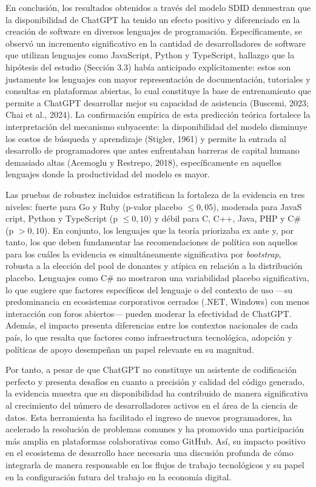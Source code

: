 \documentclass[12pt,a4paper]{article}
\begin{document}
En conclusión, los resultados obtenidos a través del modelo SDID demuestran que la disponibilidad de ChatGPT ha tenido un efecto positivo y diferenciado en la creación de software en diversos lenguajes de programación. Específicamente, se observó un incremento significativo en la cantidad de desarrolladores de software que utilizan lenguajes como JavaScript, Python y TypeScript, hallazgo que la hipótesis del estudio (Sección 3.3) había anticipado explícitamente: estos son justamente los lenguajes con mayor representación de documentación, tutoriales y consultas en plataformas abiertas, lo cual constituye la base de entrenamiento que permite a ChatGPT desarrollar mejor su capacidad de asistencia (Buscemi, 2023; Chai et al., 2024). La confirmación empírica de esta predicción teórica fortalece la interpretación del mecanismo subyacente: la disponibilidad del modelo disminuye los costos de búsqueda y aprendizaje (Stigler, 1961) y permite la entrada al desarrollo de programadores que antes enfrentaban barreras de capital humano demasiado altas (Acemoglu y Restrepo, 2018), específicamente en aquellos lenguajes donde la productividad del modelo es mayor.

Las pruebas de robustez incluidos estratifican la fortaleza de la evidencia en tres niveles: fuerte para Go y Ruby (p-valor placebo $\leq 0{,}05$), moderada para JavaS cript, Python y TypeScript (p $\leq 0{,}10$) y débil para C, C++, Java, PHP y C\# (p $> 0{,}10$). En conjunto, los lenguajes que la teoría priorizaba ex ante y, por tanto, los que deben fundamentar las recomendaciones de política son aquellos para los cuáles la evidencia es simultáneamente significativa por \textit{bootstrap}, robusta a la elección del pool de donantes y atípica en relación a la distribución placebo. Lenguajes como C\# no mostraron una variabilidad placebo significativa, lo que sugiere que factores específicos del lenguaje o del contexto de uso —su predominancia en ecosistemas corporativos cerrados (.NET, Windows) con menos interacción con foros abiertos— pueden moderar la efectividad de ChatGPT. Además, el impacto presenta diferencias entre los contextos nacionales de cada país, lo que resalta que factores como infraestructura tecnológica, adopción y políticas de apoyo desempeñan un papel relevante en su magnitud.

Por tanto, a pesar de que ChatGPT no constituye un asistente de codificación perfecto y presenta desafíos en cuanto a precisión y calidad del código generado, la evidencia muestra que su disponibilidad ha contribuido de manera significativa al crecimiento del número de desarrolladores activos en el área de la ciencia de datos. Esta herramienta ha facilitado el ingreso de nuevos programadores, ha acelerado la resolución de problemas comunes y ha promovido una participación más amplia en plataformas colaborativas como GitHub. Así, su impacto positivo en el ecosistema de desarrollo hace necesaria una discusión profunda de cómo integrarla de manera responsable en los flujos de trabajo tecnológicos y su papel en la configuración futura del trabajo en la economía digital.
\end{document}

